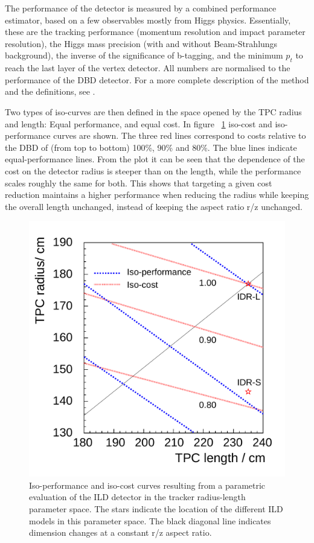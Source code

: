 The performance of the detector is measured by a combined performance estimator, based on a few observables mostly from Higgs physics. Essentially, these are the tracking performance (momentum resolution and impact parameter resolution), the Higgs mass precision (with and without Beam-Strahlungs background), the inverse of the significance of b-tagging, and the minimum $p_t$ to reach the last layer of the vertex detector. All numbers are normalised to the performance of the DBD detector. For a more complete description of the method and the definitions, see \cite{Ref:bib:TPCOPT}. 

Two types of iso-curves are then defined in the space opened by the TPC radius and length: Equal performance, and equal cost. In figure ~\ref{fig:ILD:aspect_ratio} iso-cost and iso-performance curves are shown. The three red lines correspond to costs relative to the DBD of (from top to bottom) 100\%, 90\% and 80\%. The blue lines indicate equal-performance lines. From the plot it can be seen that the dependence of the cost on the detector radius is steeper than on the length, while the performance scales roughly the same for both. This shows that targeting a given cost reduction maintains a higher performance when reducing the radius while keeping the overall length unchanged, instead of keeping the aspect ratio r/z unchanged.  

\begin{figure}[t!]
\centering
\includegraphics[width=0.5\hsize]{ILD/fig/aspect_ratio.pdf}
\caption{Iso-performance and iso-cost curves resulting from a parametric evaluation of the ILD detector in the tracker radius-length parameter space. The stars indicate the location of the different ILD models in this parameter space. The black diagonal line indicates dimension changes at a constant r/z aspect ratio.}
\label{fig:ILD:aspect_ratio}
\end{figure}

